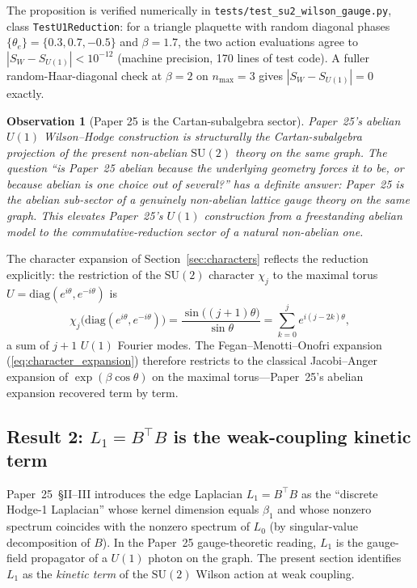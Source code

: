 \documentclass[11pt]{article}
\newtheorem{observation}{Observation}
\begin{document}
The proposition is verified numerically in
\texttt{tests/test\_su2\_wilson\_gauge.py}, class
\texttt{TestU1Reduction}: for a triangle plaquette with random
diagonal phases $\{\theta_e\} = \{0.3, 0.7, -0.5\}$ and $\beta = 1.7$,
the two action evaluations agree to $|S_W - S_{U(1)}| < 10^{-12}$
(machine precision, 170 lines of test code).  A fuller
random-Haar-diagonal check at $\beta = 2$ on $n_{\max} = 3$ gives
$|S_W - S_{U(1)}| = 0$ exactly.

\begin{observation}[Paper 25 is the Cartan-subalgebra sector]
\label{obs:cartan_subalgebra}
Paper~25's abelian $U(1)$ Wilson--Hodge construction is structurally
the Cartan-subalgebra projection of the present non-abelian
$\mathrm{SU}(2)$ theory on the same graph.  The question ``is
Paper~25 abelian because the underlying geometry forces it to be, or
because abelian is one choice out of several?'' has a definite
answer: Paper~25 is the abelian sub-sector of a genuinely
non-abelian lattice gauge theory on the same graph.  This elevates
Paper~25's $U(1)$ construction from a freestanding abelian model to
the commutative-reduction sector of a natural non-abelian one.
\end{observation}

The character expansion of Section~\ref{sec:characters} reflects the
reduction explicitly: the restriction of the $\mathrm{SU}(2)$
character $\chi_j$ to the maximal torus
$U = \mathrm{diag}(e^{i\theta}, e^{-i\theta})$ is
\begin{equation}
\chi_j\bigl(\mathrm{diag}(e^{i\theta}, e^{-i\theta})\bigr)
= \frac{\sin\bigl((j+1)\theta\bigr)}{\sin\theta}
= \sum_{k=0}^{j} e^{i(j - 2k)\theta},
\label{eq:character_restriction}
\end{equation}
a sum of $j+1$ $U(1)$ Fourier modes.  The Fegan--Menotti--Onofri
expansion (\ref{eq:character_expansion}) therefore restricts to the
classical Jacobi--Anger expansion of $\exp(\beta \cos \theta)$ on the
maximal torus---Paper~25's abelian expansion recovered term by term.

\subsection{Result 2: $L_1 = B^{\top} B$ is the weak-coupling kinetic term}
\label{sec:L1_kinetic}

Paper~25~\S II--III introduces the edge Laplacian $L_1 = B^{\top} B$
as the ``discrete Hodge-1 Laplacian'' whose kernel dimension equals
$\beta_1$ and whose nonzero spectrum coincides with the nonzero
spectrum of $L_0$ (by singular-value decomposition of $B$).  In the
Paper~25 gauge-theoretic reading, $L_1$ is the gauge-field propagator
of a $U(1)$ photon on the graph.  The present section identifies
$L_1$ as the \emph{kinetic term} of the $\mathrm{SU}(2)$ Wilson action
at weak coupling.
\end{document}
